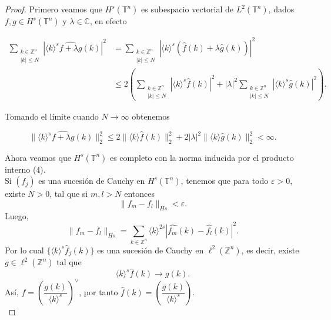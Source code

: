 \documentclass[12pt]{article}
\newcommand\Z{\ensuremath{\mathbb{Z}}}
\newcommand\C{\ensuremath{\mathbb{C}}}
\newcommand\T{\mathbb{T}}
\renewcommand{\epsilon}{\varepsilon}
\renewcommand{\hat}{\widehat}
\begin{document}
\begin{proof}
Primero veamos que $H^s(\T^n)$ es subespacio vectorial de $L^2(\T^n)$, dados $f,g\in H^s(\T^n)$ y $\lambda\in \C$, en efecto

\begin{align*}
    \sum_{\substack{k\in \Z^n\\
    |k|\leq N}}|\langle k\rangle^s \hat{f+\lambda g}(k)|^2&=\sum_{\substack{k\in \Z^n\\
    |k|\leq N}}|\langle k\rangle^s( \hat{f}(k)+\lambda \hat{g}(k))|^2\\
    &\leq2\left(\sum_{\substack{k\in \Z^n\\
    |k|\leq N}}|\langle k\rangle^s\hat{f}(k)|^2+|\lambda|^2\sum_{\substack{k\in \Z^n\\
    |k|\leq N}}|\langle k\rangle^s \hat{g}(k)|^2\right)
.\end{align*}

Tomando el límite cuando $N\to \infty$ obtenemos

$$\|\langle k\rangle^s\hat{f+\lambda g}(k)\|_2^2\leq2 \|\langle k\rangle\hat{f}(k)\|_2^2+2|\lambda|^2\|\langle k\rangle\hat{g}(k)\|_2^2<\infty.$$

Ahora veamos que $H^s(\T^n)$ es completo con la norma inducida por el producto interno (4).\\

Si $(f_j)$ es una sucesión de Cauchy en $H^s(\T^n)$, tenemos que para todo $\varepsilon> 0$, existe $N>0$, tal que si $m,l>N$ entonces
$$\| f_m-f_l\|_{H{s}}< \epsilon. $$
Luego, $$\| f_m-f_l\|_{H{s}}=\displaystyle\sum_{k\in \Z^{n}}\langle k\rangle ^{2s}|\widehat{f_{m}}(k)-\widehat{f_{l}}(k)|^{2}.$$
Por lo cual $\{\langle k \rangle^{s}\widehat{f}_j(k)\}$ es una sucesión de Cauchy en $\ell^{2}(\Z^{n})$, es decir, existe $g\in \ell^{2}(\Z^{n}) $ tal que
$$\langle k \rangle ^{s}\hat{f}(k)\rightarrow g(k).$$
Así, $f=\left(\dfrac{g(k)}{\langle k \rangle^{s}}\right)^{\vee}$, por tanto $\hat{f}(k)=\left(\dfrac{g(k)}{\langle k \rangle^{s}}\right)$.\\


\end{proof}
\end{document}
